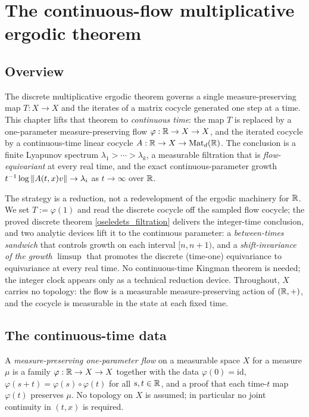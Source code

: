 \chapter{The continuous-flow multiplicative ergodic theorem}
\label{chap:continuous}

\section{Overview}

The discrete multiplicative ergodic theorem governs a single measure-preserving
map \( T : X \to X \) and the iterates of a matrix cocycle generated one step at a
time. This chapter lifts that theorem to \emph{continuous time}: the map \( T \) is
replaced by a one-parameter measure-preserving flow \( \varphi : \mathbb{R} \to X \to X \),
and the iterated cocycle by a continuous-time linear cocycle
\( A : \mathbb{R} \to X \to \mathrm{Mat}_d(\mathbb{R}) \). The conclusion is a finite Lyapunov
spectrum \( \lambda_1 > \cdots > \lambda_k \), a measurable filtration that is
\emph{flow-equivariant} at every real time, and the exact continuous-parameter
growth \( t^{-1} \log\left\lVert A(t,x)v \right\rVert \to \lambda_i \) as \( t \to \infty \) over \( \mathbb{R} \).

The strategy is a reduction, not a redevelopment of the ergodic machinery for \( \mathbb{R} \).
We set \( T := \varphi(1) \) and read the discrete cocycle off the sampled flow cocycle;
the proved discrete theorem \ref{oseledets_filtration} delivers the integer-time
conclusion, and two analytic devices lift it to the continuous parameter: a
\emph{between-times sandwich} that controls growth on each interval \( [n, n+1) \), and a
\emph{shift-invariance of the growth} \( \limsup \) that promotes the discrete (time-one)
equivariance to equivariance at every real time. No continuous-time Kingman theorem is
needed; the integer clock appears only as a technical reduction device. Throughout,
\( X \) carries no topology: the flow is a measurable measure-preserving action of
\( (\mathbb{R}, +) \), and the cocycle is measurable in the state at each fixed time.

\section{The continuous-time data}

\begin{definition}\label{MeasurePreservingFlow}
  \leanok
  A \emph{measure-preserving one-parameter flow} on a measurable space \( X \) for a measure
  \( \mu \) is a family \( \varphi : \mathbb{R} \to X \to X \) together with the data
  \( \varphi(0) = \mathrm{id} \), \( \varphi(s+t) = \varphi(s) \circ \varphi(t) \) for all
  \( s, t \in \mathbb{R} \), and a proof that each time-\( t \) map \( \varphi(t) \) preserves \( \mu \).
  No topology on \( X \) is assumed; in particular no joint continuity in \( (t, x) \) is
  required.
\end{definition}

